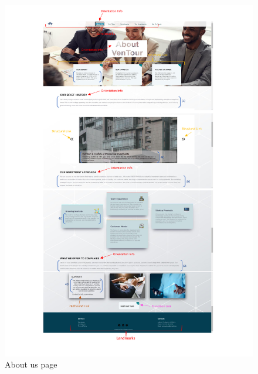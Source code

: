 \documentclass[../../DD.tex]{subsubfiles}
\begin{document}
  \begin{figure}
      \centering
      \includegraphics[width=\textwidth]{Images/screenshots/About Us_screen.pdf}
      \caption{About us page}
      \label{fig: About_us_screen}
  \end{figure}
\end{document}
